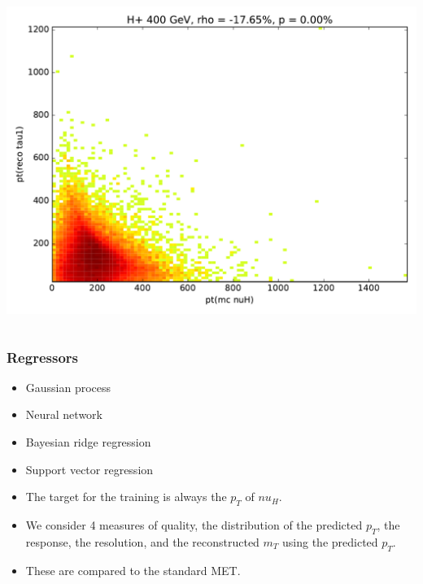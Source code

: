 \documentclass[9pt, lualatex]{beamer}
\begin{document}
\begin{frame}
\begin{columns}
        \includegraphics[width=\textwidth]{correlations/hp400_pt_reco_tau1.pdf}
    \end{columns}

\end{frame}

\begin{frame}
    \frametitle{Regressors}
    \begin{itemize}
    \item Gaussian process
    \item Neural network
    \item Bayesian ridge regression
    \item Support vector regression
    \end{itemize}
    \vfill
    \begin{itemize}
        \item The target for the training is always the $p_T$ of $nu_H$.
        \item We consider 4 measures of quality, the distribution of the predicted $p_T$, the response, the resolution,
            and the reconstructed $m_T$ using the predicted $p_T$.
        \item These are compared to the standard MET.
    \end{itemize}
\end{frame}
\end{document}
